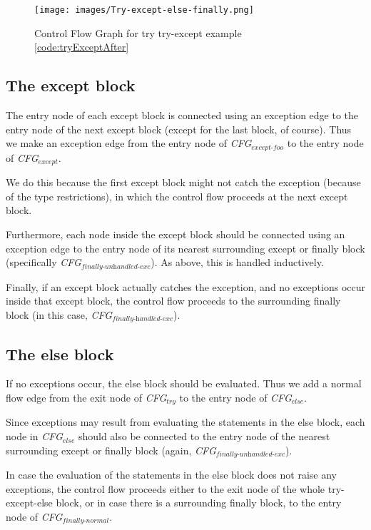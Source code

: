 \begin{figure}
  \vspace{-20pt}
  \begin{center}
    \texttt{[image: images/Try-except-else-finally.png]}
  \end{center}
  \vspace{-10pt}
  \caption{Control Flow Graph for try try-except example \ref{code:tryExceptAfter}}
  \label{fig:tryExceptCfg}
  \vspace{-10pt}
\end{figure}

\subsection{The except block}
The entry node of each except block is connected using an exception edge to the entry node of the next except block (except for the last block, of course). 
Thus we make an exception edge from the entry node of \textit{CFG$_{\textit{except-foo}}$} to the entry node of \textit{CFG$_{\textit{except}}$}.

We do this because the first except block might not catch the exception (because of the type restrictions), 
in which the control flow proceeds at the next except block.

Furthermore, each node inside the except block should be connected using an exception edge to the entry node
 of its nearest surrounding except or finally block (specifically \textit{CFG$_{\textit{finally-unhandled-exc}}$}). As above, this is handled inductively.

Finally, if an except block actually catches the exception, and no exceptions occur inside that except block, 
the control flow proceeds to the surrounding finally block (in this case, \textit{CFG$_{\textit{finally-handled-exc}}$}). 

\subsection{The else block}
If no exceptions occur, the else block should be evaluated. Thus we add a normal flow edge from the exit node of \textit{CFG$_{\textit{try}}$} 
to the entry node of \textit{CFG$_{\textit{else}}$}.

Since exceptions may result from evaluating the statements in the else block, each node in \textit{CFG$_{\textit{else}}$} 
should also be connected to the entry node of the nearest surrounding except or finally block (again, \textit{CFG$_{\textit{finally-unhandled-exc}}$}).

In case the evaluation of the statements in the else block does not raise any exceptions, 
the control flow proceeds either to the exit node of the whole try-except-else block, or in case there is a surrounding finally block, 
to the entry node of \textit{CFG$_{\textit{finally-normal}}$}.
